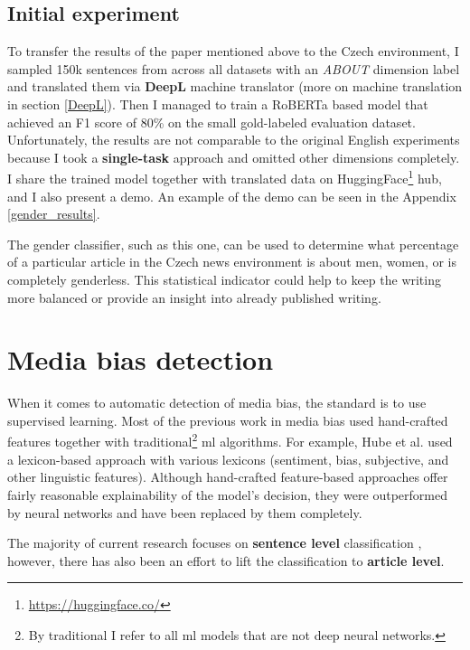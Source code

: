 \subsection{Initial experiment}
To transfer the results of the paper mentioned above to the Czech environment, I sampled 150k sentences from across all datasets with an \textit{ABOUT} dimension label and translated them via \textbf{DeepL} machine translator (more on machine translation in section \ref{DeepL}). Then I managed to train a RoBERTa based model that achieved an F1 score of 80\% on the small gold-labeled evaluation dataset. 
Unfortunately, the results are not comparable to the original English experiments because I took a \textbf{single-task} approach and omitted other dimensions completely. I share the trained model together with translated data on HuggingFace\footnote{\url{https://huggingface.co/}} hub, and I also present a demo. An example of the demo can be seen in the Appendix \ref{gender_results}.

The gender classifier, such as this one, can be used to determine what percentage of a particular article in the Czech news environment is about men, women, or is completely genderless. This statistical indicator could help to keep the writing more balanced or provide an insight into already published writing.





\section{Media bias detection}\label{mediabias}
When it comes to automatic detection of media bias, the standard is to use supervised learning. Most of the previous work in media bias used hand-crafted features together with traditional\footnote{By traditional I refer to all \Gls{ml} models that are not deep neural networks.} \Gls{ml} algorithms. For example, Hube et al. \cite{hube2018detecting} used a lexicon-based approach with various lexicons (sentiment, bias, subjective, and other linguistic features). Although hand-crafted feature-based approaches offer fairly reasonable explainability of the model's decision, they were outperformed by neural networks and have been replaced by them completely.

The majority of current research focuses on \textbf{sentence level} classification \cite{sinha2021determining,Spinde2021MBIC,lee2021unifying,hube2019neural}, however, there has also been an effort to lift the classification to \textbf{article level}.

